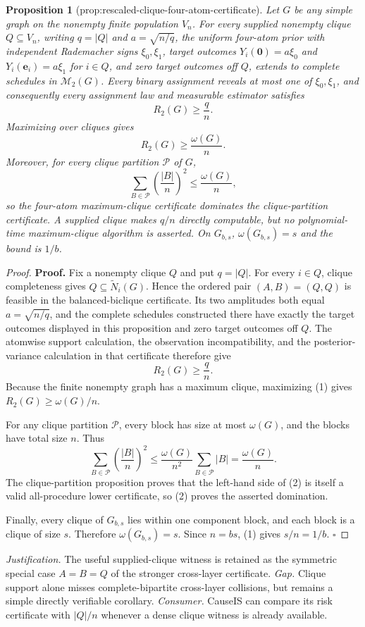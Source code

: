 \documentclass{article}
\newtheorem{proposition}{Proposition}
\begin{document}
\begin{proposition}[prop:rescaled-clique-four-atom-certificate]\label{prop:rescaled-clique-four-atom-certificate}
Let \(G\) be any simple graph on the nonempty finite population \(V_n\).  For every supplied nonempty clique \(Q\subseteq V_n\), writing \(q=|Q|\) and \(a=\sqrt{n/q}\), the uniform four-atom prior with independent Rademacher signs \(\xi_0,\xi_1\), target outcomes \(Y_i(\mathbf 0)=a\xi_0\) and \(Y_i(\mathbf e_i)=a\xi_1\) for \(i\in Q\), and zero target outcomes off \(Q\), extends to complete schedules in \(\mathcal M_2(G)\).  Every binary assignment reveals at most one of \(\xi_0,\xi_1\), and consequently every assignment law and measurable estimator satisfies
\[
R_2(G)\geq \frac{q}{n}.
\]
Maximizing over cliques gives
\[
R_2(G)\geq\frac{\omega(G)}{n}.
\]
Moreover, for every clique partition \(\mathcal P\) of \(G\),
\[
\sum_{B\in\mathcal P}\left(\frac{|B|}{n}\right)^2
\leq \frac{\omega(G)}{n},
\]
so the four-atom maximum-clique certificate dominates the clique-partition certificate.  A supplied clique makes \(q/n\) directly computable, but no polynomial-time maximum-clique algorithm is asserted.  On \(G_{b,s}\), \(\omega(G_{b,s})=s\) and the bound is \(1/b\).
\end{proposition}
\begin{proof}
\textbf{Proof.}
Fix a nonempty clique \(Q\) and put \(q=|Q|\).  For every \(i\in Q\), clique completeness gives \(Q\subseteq\widetilde N_i(G)\).  Hence the ordered pair \((A,B)=(Q,Q)\) is feasible in the balanced-biclique certificate.  Its two amplitudes both equal \(a=\sqrt{n/q}\), and the complete schedules constructed there have exactly the target outcomes displayed in this proposition and zero target outcomes off \(Q\).  The atomwise support calculation, the observation incompatibility, and the posterior-variance calculation in that certificate therefore give
\[
R_2(G)\geq\frac{q}{n}.
\tag{1}
\]
Because the finite nonempty graph has a maximum clique, maximizing (1) gives \(R_2(G)\geq\omega(G)/n\).

For any clique partition \(\mathcal P\), every block has size at most \(\omega(G)\), and the blocks have total size \(n\).  Thus
\[
\sum_{B\in\mathcal P}\left(\frac{|B|}{n}\right)^2
\leq\frac{\omega(G)}{n^2}\sum_{B\in\mathcal P}|B|
=\frac{\omega(G)}n.
\tag{2}
\]
The clique-partition proposition proves that the left-hand side of (2) is itself a valid all-procedure lower certificate, so (2) proves the asserted domination.

Finally, every clique of \(G_{b,s}\) lies within one component block, and each block is a clique of size \(s\).  Therefore \(\omega(G_{b,s})=s\).  Since \(n=bs\), (1) gives \(s/n=1/b\). \(\square\)
\end{proof}
\par\smallskip\noindent \textit{Justification.} The useful supplied-clique witness is retained as the symmetric special case \(A=B=Q\) of the stronger cross-layer certificate. \textit{Gap.} Clique support alone misses complete-bipartite cross-layer collisions, but remains a simple directly verifiable corollary. \textit{Consumer.} CauseIS can compare its risk certificate with \(|Q|/n\) whenever a dense clique witness is already available.
\end{document}
